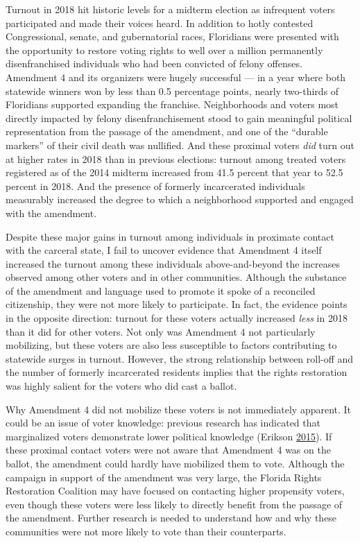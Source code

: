 \documentclass[
  12pt,
]{article}
\begin{document}
Turnout in 2018 hit historic levels for a midterm election as infrequent voters participated and made their voices heard. In addition to hotly contested Congressional, senate, and gubernatorial races, Floridians were presented with the opportunity to restore voting rights to well over a million permanently disenfranchised individuals who had been convicted of felony offenses. Amendment 4 and its organizers were hugely successful --- in a year where both statewide winners won by less than 0.5 percentage points, nearly two-thirds of Floridians supported expanding the franchise. Neighborhoods and voters most directly impacted by felony disenfranchisement stood to gain meaningful political representation from the passage of the amendment, and one of the ``durable markers'' of their civil death was nullified. And these proximal voters \emph{did} turn out at higher rates in 2018 than in previous elections: turnout among treated voters registered as of the 2014 midterm increased from 41.5 percent that year to 52.5 percent in 2018. And the presence of formerly incarcerated individuals measurably increased the degree to which a neighborhood supported and engaged with the amendment.

Despite these major gains in turnout among individuals in proximate contact with the carceral state, I fail to uncover evidence that Amendment 4 itself increased the turnout among these individuals above-and-beyond the increases observed among other voters and in other communities. Although the substance of the amendment and language used to promote it spoke of a reconciled citizenship, they were not more likely to participate. In fact, the evidence points in the opposite direction: turnout for these voters actually increased \emph{less} in 2018 than it did for other voters. Not only was Amendment 4 not particularly mobilizing, but these voters are also less susceptible to factors contributing to statewide surges in turnout. However, the strong relationship between roll-off and the number of formerly incarcerated residents implies that the rights restoration was highly salient for the voters who did cast a ballot.

Why Amendment 4 did not mobilize these voters is not immediately apparent. It could be an issue of voter knowledge: previous research has indicated that marginalized voters demonstrate lower political knowledge (Erikson \protect\hyperlink{ref-Erikson2015}{2015}). If these proximal contact voters were not aware that Amendment 4 was on the ballot, the amendment could hardly have mobilized them to vote. Although the campaign in support of the amendment was very large, the Florida Rights Restoration Coalition may have focused on contacting higher propensity voters, even though these voters were less likely to directly benefit from the passage of the amendment. Further research is needed to understand how and why these communities were not more likely to vote than their counterparts.
\end{document}
